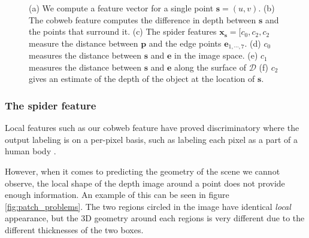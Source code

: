 \documentclass[10pt,twocolumn,letterpaper]{article}
\newcommand{\rgbdimage}{\mathcal{D}}
\newcommand{\pixelidx}{\mathbf{s}}
\newcommand{\edgeimidx}{\mathbf{e}}
\newcommand{\point}{\mathbf{p}}
\newcommand{\note}[1]{\textcolor{blue}{NOTE: #1}}
\begin{document}
\begin{figure}[tb]
        \hfill
        \hfill
    \caption{
    (a) We compute a feature vector for a single point $\pixelidx = (u, v)$.
    (b) The cobweb feature computes the difference in depth between $\pixelidx$ and the points that surround it.
    (c) The spider features $\mathbf{x_s} = [c_0, c_2, c_2$ measure the distance between $\point$ and the edge points $\edgeimidx_{1, \cdots, 7}$.
    (d) $c_0$ measures the distance between $\pixelidx$ and $\edgeimidx$ in the image space.
    (e) $c_1$ measures the distance between $\pixelidx$ and $\edgeimidx$ along the surface of $\rgbdimage$
    (f) $c_2$ gives an estimate of the depth of the object at the location of $\pixelidx$.
    }%
    \label{fig:features}
\end{figure}


\subsubsection{The spider feature}

Local features such as our cobweb feature have proved discriminatory where the output labeling is on a per-pixel basis, such as labeling each pixel as a part of a human body \cite{shotton-cvpr-2011}.

However, when it comes to predicting the geometry of the scene we cannot observe, the local shape of the depth image around a point does not provide enough information. 
An example of this can be seen in figure \ref{fig:patch_problems}.
The two regions circled in the image have identical \emph{local} appearance, but the 3D geometry around each regions is very different due to the different thicknesses of the two boxes.
\end{document}
